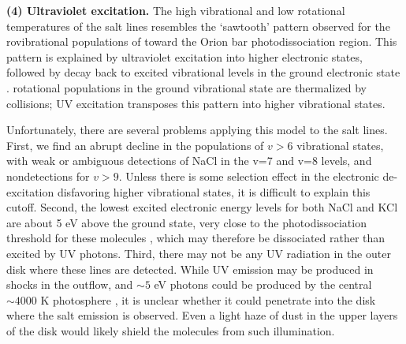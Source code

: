 \documentclass[12pt]{article}
\begin{document}
\par{\textbf{(4) Ultraviolet excitation.}}
%
%
The high vibrational and low rotational temperatures of the
salt lines resembles the `sawtooth' pattern observed for the rovibrational
populations of \hh toward the Orion bar photodissociation region.  This
pattern is explained by ultraviolet excitation into higher electronic states,
followed by decay back to excited vibrational levels in the ground electronic
state \cite{Kaplan2017a}.  \hh rotational populations in the ground vibrational
state are thermalized by collisions; UV excitation transposes this pattern into
higher vibrational states.


Unfortunately, there are several problems applying this model to the salt lines.
First, we find an abrupt decline in the populations of $v > 6$ vibrational states,
with weak or ambiguous detections of NaCl in the v=7 and v=8 levels, and
nondetections for $v > 9$.  Unless there is
some selection effect in the electronic de-excitation disfavoring higher vibrational
states, it is difficult to explain this cutoff.  
Second, the lowest excited electronic energy levels for both NaCl and KCl are about
5 eV above the ground state, very close to the photodissociation threshold for these
molecules \cite{Zeiri1983, Silver1986}, which
may therefore be dissociated rather than excited by UV photons.
Third, there may not be any UV radiation in the outer disk where these lines
are detected.  
While UV
emission may be produced in shocks in the outflow, and $\sim5$ eV photons
could be produced by the central $\sim4000$ K photosphere \cite{Testi2010a},
it is unclear whether it could penetrate into the disk where the salt emission
is observed.  Even a light haze of dust in the upper layers of the disk would
likely shield the molecules from such illumination.
\end{document}
